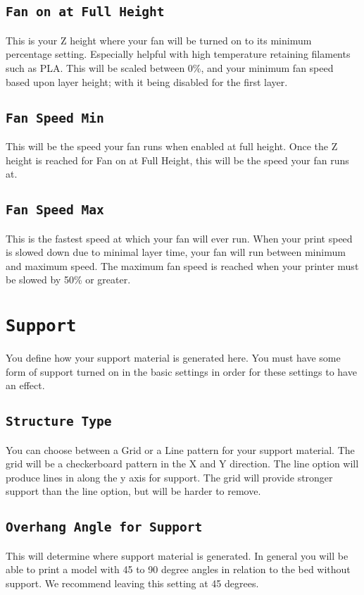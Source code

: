 \subsection{\texttt{Fan on at Full Height}}
This is your Z height where your fan will be turned on to its minimum percentage setting. Especially helpful with high temperature retaining filaments such as PLA. This will be scaled between 0\%, and your minimum fan speed based upon layer height; with it being disabled for the first layer.

\subsection{\texttt{Fan Speed Min}}

This will be the speed your fan runs when enabled at full height. Once the Z height is reached for Fan on at Full Height, this will be the speed your fan runs at.

\subsection{\texttt{Fan Speed Max}}
This is the fastest speed at which your fan will ever run. When your print speed is slowed down due to minimal layer time, your fan will run between minimum and maximum speed. The maximum fan speed is reached when your printer must be slowed by 50\% or greater.

\section{\texttt{Support}}
You define how your support material is generated here. You must have some form of support turned on in the basic settings in order for these settings to have an effect.

\subsection{\texttt{Structure Type}}
You can choose between a Grid or a Line pattern for your support material. The grid will be a checkerboard pattern in the X and Y direction. The line option will produce lines in along the y axis for support. The grid will provide stronger support than the line option, but will be harder to remove.

\subsection{\texttt{Overhang Angle for Support}}
This will determine where support material is generated. In general you will be able to print a model with 45 to 90 degree angles in relation to the bed without support. We recommend leaving this setting at 45 degrees.


